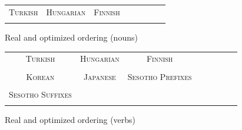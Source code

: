\documentclass[11pt,letterpaper]{article}
\begin{document}
\begin{figure}[]
\begin{tabular}{cccccccc}
\textsc{Turkish} & \textsc{Hungarian} & \textsc{Finnish} \\
\begin{minipage}{.3\textwidth}
  
    \end{minipage}
  &
  \begin{minipage}{.3\textwidth}
  
    \end{minipage}
  &
  \begin{minipage}{.3\textwidth}
  
  \end{minipage}
  \end{tabular}
  
    \caption{Real and optimized ordering (nouns)}
    \label{tab:my_label}
\end{figure}


\begin{figure}[]

\begin{tabular}{cccccccc}
\textsc{Turkish} & \textsc{Hungarian} & \textsc{Finnish} \\
\begin{minipage}{.3\textwidth}
  
  \end{minipage}
  &
  \begin{minipage}{.3\textwidth}
  
  \end{minipage}
  &
    \begin{minipage}{.3\textwidth}
  
  \end{minipage}
  \\
  \textsc{Korean}  & \textsc{Japanese} & \textsc{Sesotho Prefixes} \\
      \begin{minipage}{.3\textwidth}
  
  \end{minipage}
  &
  \begin{minipage}{.3\textwidth}
  
  \end{minipage}
  &
  \begin{minipage}{.3\textwidth}
  
  \end{minipage} \\
  \textsc{Sesotho Suffixes} \\
  \begin{minipage}{.3\textwidth}
  
  \end{minipage}
  \end{tabular}
  
  
    \caption{Real and optimized ordering (verbs)}
    \label{tab:my_label}
\end{figure}
\end{document}
